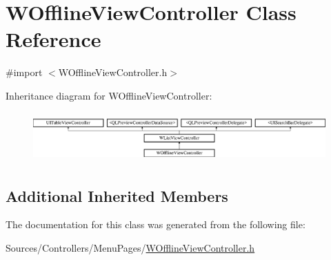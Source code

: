 \hypertarget{interface_w_offline_view_controller}{\section{W\-Offline\-View\-Controller Class Reference}
\label{interface_w_offline_view_controller}
}


{\ttfamily \#import $<$W\-Offline\-View\-Controller.\-h$>$}

Inheritance diagram for W\-Offline\-View\-Controller\-:\begin{figure}[H]
\begin{center}
\leavevmode
\includegraphics[height=1.909091cm]{interface_w_offline_view_controller}
\end{center}
\end{figure}
\subsection*{Additional Inherited Members}


The documentation for this class was generated from the following file\-:\begin{DoxyCompactItemize}
\item 
Sources/\-Controllers/\-Menu\-Pages/\hyperlink{_w_offline_view_controller_8h}{W\-Offline\-View\-Controller.\-h}\end{DoxyCompactItemize}
